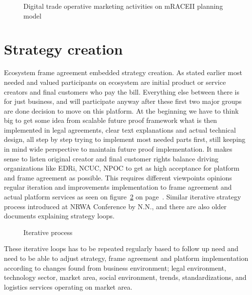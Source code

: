 \begin{figure}\begin{center}
\caption{Digital trade operative marketing activities on mRACEII planning
 model}\label{fig:mRACEII}
\end{center}\end{figure}

\section{Strategy creation}\label{strategy_creation}
Ecosystem frame agreement embedded strategy creation.
As stated earlier most needed and valued participants on ecosystem are initial
product or service creators and final customers who pay the bill. Everything
else between there is for just business, and will participate anyway after
these first two major groups are done decision to move on this platform. At
the beginning we have to think big to get some idea from scalable future proof
framework what is then implemented in legal agreements, clear text
explanations and actual technical design, all step by step trying to implement
most needed parts first, still keeping in mind wide perspective to maintain
future proof implementation. It makes sense to listen original creator and
final customer rights balance driving organizations like EDRi, NCUC, NPOC to
get as high acceptance for platform and frame agreement as possible. This
requires different viewpoints opinions regular iteration and improvements
implementation to frame agreement and actual platform services as seen on
figure~\ref{fig:iteration} on page~\pageref{fig:iteration}. Similar iterative
strategy process introduced at NRWA Conference by N.N.\allowbreak\cite{
NNlostAtNRWC2022}, and there are also older documents explaining strategy
loops.

\begin{figure}\begin{center}
\caption{Iterative process}\label{fig:iteration}
\end{center}\end{figure}

These iterative loops has to be repeated regularly based to follow up need and
need to be able to adjust strategy, frame agreement and platform
implementation according to changes found from business environment; legal
environment, technology sector, market area, social environment, trends,
standardizations, and logistics services operating on market area.

